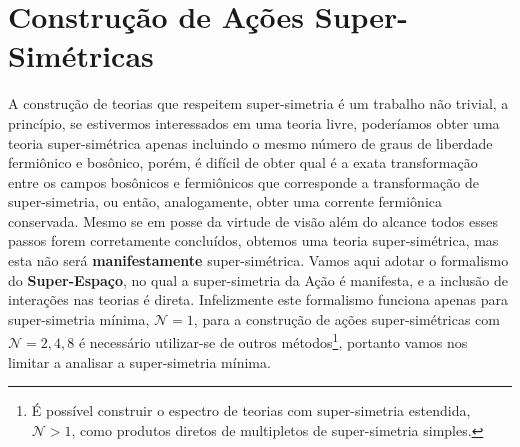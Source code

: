 \section{Construção de Ações Super-Simétricas}
A construção de teorias que respeitem super-simetria é um trabalho não trivial, a princípio, se estivermos 
interessados em uma teoria livre, poderíamos obter uma teoria super-simétrica apenas incluindo o mesmo número de 
graus de liberdade fermiônico e bosônico, porém, é difícil de obter qual é a exata transformação entre os 
campos bosônicos e fermiônicos que corresponde a transformação de super-simetria, ou então, analogamente, obter 
uma corrente fermiônica conservada. Mesmo se em posse da virtude de visão além do alcance todos esses passos 
forem corretamente concluídos, obtemos uma teoria super-simétrica, mas esta não será \textbf{manifestamente} 
super-simétrica. Vamos aqui adotar o formalismo do \textbf{Super-Espaço}, no qual a super-simetria da Ação é 
manifesta, e a inclusão de interações nas teorias é direta. Infelizmente este formalismo funciona apenas para 
super-simetria mínima, $\mathcal N=1$, para a construção de ações super-simétricas com $\mathcal N=2,4,8$ é 
necessário utilizar-se de outros métodos\footnote{É possível construir o espectro de teorias com super-simetria estendida, $\mathcal N>1$, como produtos diretos de multipletos de super-simetria simples.}, portanto vamos nos limitar a analisar a super-simetria mínima.

